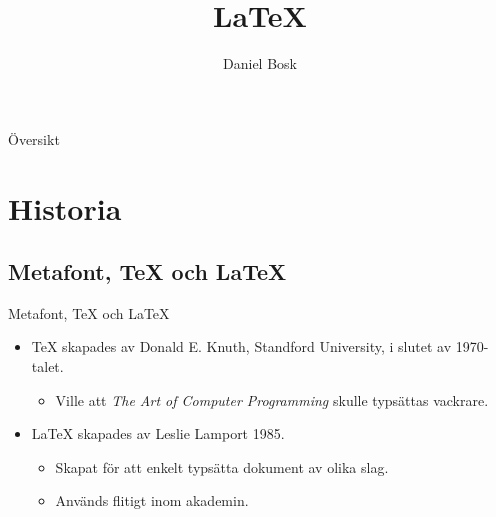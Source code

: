 \documentclass{beamer} %
\title{%
	\LaTeX
}
\author{Daniel Bosk}
\institute[MIUN ITM]{%
	Institutionen för informationsteknologi och medier (ITM),\\
	Mittuniversitetet, Sundsvall.
}
\date{\svnId}
\begin{document}
\begin{frame}
  \titlepage
\end{frame}
\begin{frame}{Översikt}
	\tableofcontents%
\end{frame}

\section{Historia}

\subsection{Metafont, \TeX{} och \LaTeX{}}
\begin{frame}{Metafont, \TeX{} och \LaTeX{}}
	\begin{itemize}
		\item \TeX{} skapades av Donald E. Knuth, Standford University, i slutet av 
			1970-talet.
			\begin{itemize}
				\item Ville att \emph{The Art of Computer Programming} 
					\citep{Knuth1997tao} skulle typsättas vackrare.
			\end{itemize}
		\item \LaTeX{} skapades av Leslie Lamport 1985.
			\begin{itemize}
				\item Skapat för att enkelt typsätta dokument av olika slag.
				\item Används flitigt inom akademin.
			\end{itemize}
	\end{itemize}
\end{frame}
\end{document}
